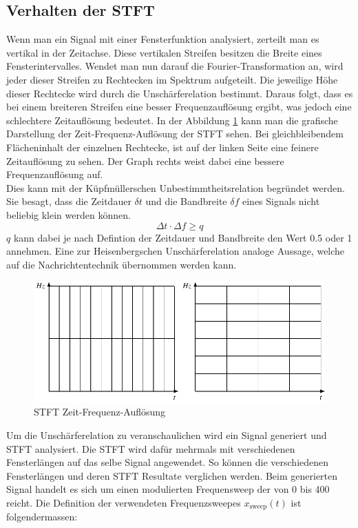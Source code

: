 \subsection{Verhalten der STFT}

Wenn man ein Signal mit einer Fensterfunktion analysiert, zerteilt man es vertikal in der Zeitachse. Diese vertikalen Streifen besitzen die Breite eines Fensterintervalles. Wendet man nun darauf die Fourier-Transformation an, wird jeder dieser Streifen zu Rechtecken im Spektrum aufgeteilt. Die jeweilige Höhe dieser Rechtecke wird durch die Unschärferelation bestimmt. Daraus folgt, dass es bei einem breiteren Streifen eine besser Frequenzauflösung ergibt, was jedoch eine schlechtere Zeitauflösung bedeutet. In der Abbildung \ref{fig:stftauf} kann man die grafische Darstellung der Zeit-Frequenz-Auflösung der STFT sehen. Bei gleichbleibendem Flächeninhalt der einzelnen Rechtecke, ist auf der linken Seite eine feinere Zeitauflösung zu sehen. Der Graph rechts weist dabei eine bessere Frequenzauflösung auf. \\

Dies kann mit der Küpfmüllerschen Unbestimmtheitsrelation begründet werden. Sie besagt, dass die Zeitdauer $\delta t$ und die Bandbreite $\delta f$ eines Signals nicht beliebig klein werden können.  
\[\Delta t \cdot \Delta f \geq q\]
$q$ kann dabei je nach Defintion der Zeitdauer und Bandbreite den Wert 0.5 oder 1 annehmen. Eine zur Heisenbergschen Unschärferelation analoge Aussage, welche auf die Nachrichtentechnik übernommen werden kann.


\begin{figure}[!ht]
	\centering
	\includegraphics[width=0.7\linewidth]{papers/autotune/sections/fft/images/windows.pdf}
	\caption{STFT Zeit-Frequenz-Auflösung}\label{fig:stftauf}	
\end{figure}




Um die Unschärferelation zu veranschaulichen wird ein Signal generiert und STFT analysiert. Die STFT wird dafür mehrmals mit verschiedenen Fensterlängen auf das selbe Signal angewendet. So können die verschiedenen Fensterlängen und deren STFT Resultate verglichen werden. Beim generierten Signal handelt es sich um einen modulierten Frequensweep der von 0 bis 400\text{[Hz]} reicht. Die Definition der verwendeten Frequenzsweepes $x_{\text{sweep}}(t)$ ist folgendermassen:

